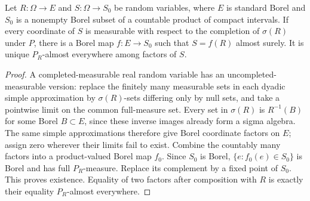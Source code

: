 \begin{lemma}\label{lem:factor}
Let $R:\Omega\to E$ and $S:\Omega\to S_0$ be random variables, where $E$ is standard Borel and $S_0$ is a nonempty Borel subset of a countable product of compact intervals. If every coordinate of $S$ is measurable with respect to the completion of $\sigma(R)$ under $P$, there is a Borel map $f:E\to S_0$ such that $S=f(R)$ almost surely. It is unique $P_R$-almost everywhere among factors of $S$.
\end{lemma}
\begin{proof}
A completed-measurable real random variable has an uncompleted-measurable version: replace the finitely many measurable sets in each dyadic simple approximation by $\sigma(R)$-sets differing only by null sets, and take a pointwise limit on the common full-measure set. Every set in $\sigma(R)$ is $R^{-1}(B)$ for some Borel $B\subset E$, since these inverse images already form a sigma algebra. The same simple approximations therefore give Borel coordinate factors on $E$; assign zero wherever their limits fail to exist. Combine the countably many factors into a product-valued Borel map $f_0$. Since $S_0$ is Borel, $\{e:f_0(e)\in S_0\}$ is Borel and has full $P_R$-measure. Replace its complement by a fixed point of $S_0$. This proves existence. Equality of two factors after composition with $R$ is exactly their equality $P_R$-almost everywhere.
\end{proof}

